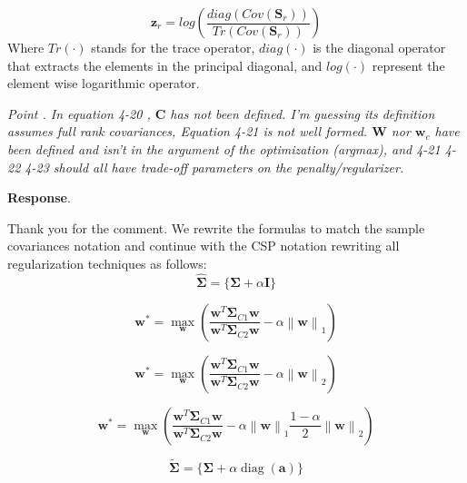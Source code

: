 \documentclass[runningheads]{llncs}
\newcommand{\Tr}[1]{Tr \left( #1 \right)}
\newcommand{\diag}[1]{diag \left( #1 \right)}
\newcommand{\ve}[1]{\bm {#1}}
\newcommand{\mat}[1]{\bm {#1}}
\newenvironment{reviewer}{\setcounter{pointcounter}{1}}{}
\newcommand{\changes}[1]{\textcolor[rgb]{1.00,0.00,0.00}{#1}}
\newcommand{\point}[1]{\medskip \noindent
  \textsl{{\fontseries{b}\selectfont Point \thepointcounter}.
\stepcounter{pointcounter} #1}}
\newcommand{\reply}{\medskip \noindent \textbf{Response}.\ }
\begin{document}
\begin{reviewer}
{    \changes{
      \begin{equation}\label{eq:CSPfeats}
        \ve{z}_r = log \left(
        \frac{\diag{Cov({\mat{S}}_{r})}}{\Tr{Cov(\mat{S}_{r})}}  \right)
      \end{equation}
    }
    \changes{
      Where $\Tr{\cdot}$ stands for the trace operator, $\diag{\cdot}$
      is the diagonal operator that extracts the elements in the
      principal diagonal, and $log(\cdot)$ represent the element wise
    logarithmic operator}.
  }

  \point{In equation 4-20 , $\mathbf{C}$ has not been defined. I'm
    guessing its definition assumes full rank covariances, Equation
    4-21 is not well formed. $\mathbf{W}$ nor $\mathbf{w}_c$ have been
    defined and isn't in the argument of the optimization (argmax), and
    4-21 4-22 4-23 should all have trade-off parameters on the
  penalty/regularizer.  }

  \reply{
    Thank you for the comment. We rewrite the formulas to match the
    sample covariances notation and continue with the CSP notation
    rewriting all regularization techniques as follows:
    \changes{
      \begin{equation}
        \hat{\mat{\Sigma}}=\{\mat{\Sigma}+\alpha \mathbf{I}\}
      \end{equation}
    }

    \changes{
      \begin{equation}
        \ve{w}^* = \max_{\ve{w}}\left( \frac{\ve{w}^T
          \mat{\Sigma}_{C1} \ve{w}}{\ve{w}^T \mat{\Sigma}_{C2} \ve{w}}
        - \alpha\left\|\ve{w}\right\|_1\right)
      \end{equation}
    }

    \changes{
      \begin{equation}
        \ve{w}^* = \max_{\ve{w}}\left( \frac{\ve{w}^T
          \mat{\Sigma}_{C1} \ve{w}}{\ve{w}^T \mat{\Sigma}_{C2} \ve{w}}
        -  \alpha\left\|\ve{w}\right\|_2 \right)
      \end{equation}
    }

    \changes{
      \begin{equation}
        \ve{w}^* = \max_{\ve{w}}\left( \frac{\ve{w}^T
          \mat{\Sigma}_{C1} \ve{w}}{\ve{w}^T \mat{\Sigma}_{C2} \ve{w}}-
          \alpha\left\|\ve{w}\right\|_1 \frac{1-\alpha}{2}
        \left\|\ve{w}\right\|_2 \right)
      \end{equation}
    }

    \changes{
      \begin{equation}
        \tilde{\mat{\Sigma}}=\{\mat{\Sigma}+\alpha\operatorname{diag}(\ve{a})\}
      \end{equation}
    }

}
\end{reviewer}
\end{document}
